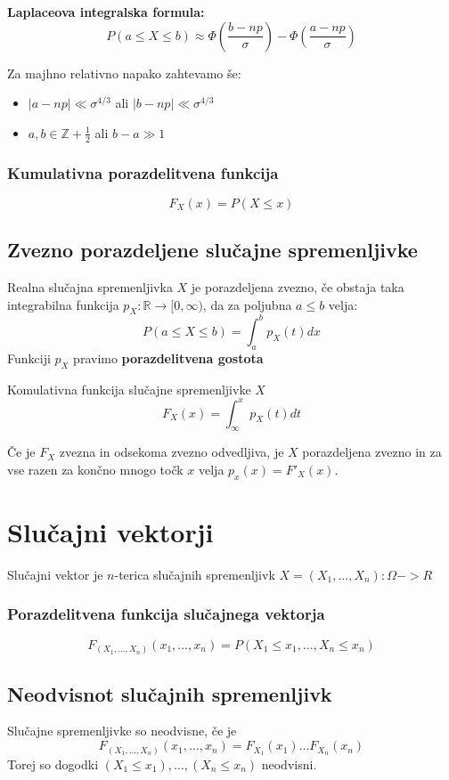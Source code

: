 \begin{multicols}{5}
\textbf{Laplaceova integralska formula: }
\[ P(a \leq X \leq b) \approx \Phi\left( \frac{b - np}{\sigma} \right) - \Phi\left( \frac{a - np}{\sigma} \right) \]

Za majhno relativno napako zahtevamo še: 
\begin{itemize}
    \item $|a-np| \ll \sigma^{4/3}$ ali $|b-np| \ll \sigma^{4/3}$ 	
    \item $a, b \in \mathbb{Z} + \frac{1}{2}$ ali $b - a \gg 1$
\end{itemize}

\subsubsection{Kumulativna porazdelitvena funkcija}
\[ F_X(x) = P(X \leq x)\]

\subsection{Zvezno porazdeljene slučajne spremenljivke}
Realna slučajna spremenljivka $X$ je porazdeljena zvezno, če obstaja taka integrabilna funkcija $p_X: \mathbb{R} \to [0, \infty)$, da za poljubna $a \leq b$ velja:
\[ P( a \leq X \leq b) = \int_a^b p_X(t) dx \]
Funkciji $p_X$ pravimo \textbf{porazdelitvena gostota}


Komulativna funkcija slučajne spremenljivke $X$
\[ F_X(x) = \int_{\infty}^x p_X(t) dt \]

Če je $F_X$ zvezna in odsekoma zvezno odvedljiva, je $X$ porazdeljena zvezno in za vse razen za končno mnogo točk $x$ velja $p_x(x) = F'_X(x)$.

\section{Slučajni vektorji}
Slučajni vektor je $n$-terica slučajnih spremenljivk $X = (X_1, \dots , X_n): \Omega -> R$ 

\subsubsection{Porazdelitvena funkcija slučajnega vektorja}
\[ F_{(X_1, \dots , X_n)}(x_1, \dots , x_n) = P(X_1 \leq x_1, \dots , X_n \leq x_n)\]

\subsection{Neodvisnot slučajnih spremenljivk}
Slučajne spremenljivke so neodvisne, če je
\[ F_{(X_1, \dots , X_n)}(x_1, \dots, x_n) = F_{X_1}(x_1) \dots F_{X_n}(x_n)\]
Torej so dogodki $(X_1 \leq x_1), \dots , (X_n \leq x_n)$ neodvisni.


\end{multicols}
